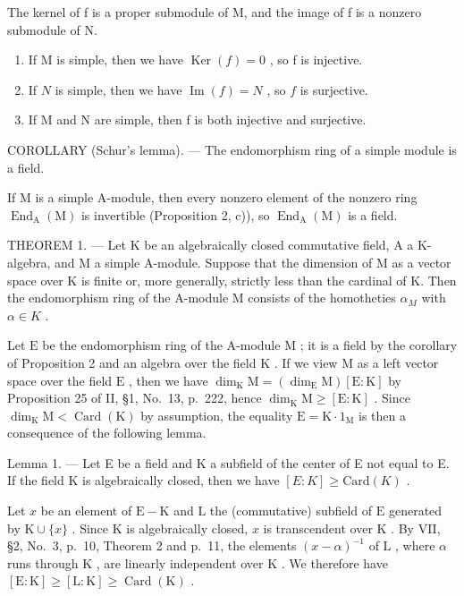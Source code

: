 The kernel of f is a proper submodule of M, and the image of f is a nonzero submodule of N.

\begin{enumerate}
\def\labelenumi{\alph{enumi})}
\item
  If M is simple, then we have \(\operatorname{Ker}(f)=0\) , so f is injective.
\item
  If \(N\) is simple, then we have \(\operatorname{Im}(f) = N\) , so \(f\) is surjective.
\item
  If M and N are simple, then f is both injective and surjective.
\end{enumerate}

COROLLARY (Schur's lemma). --- The endomorphism ring of a simple module is a field.

If M is a simple A-module, then every nonzero element of the nonzero ring \(\operatorname{End}_{\mathrm{A}}(\mathrm{M})\) is invertible (Proposition 2, c)), so \(\operatorname{End}_{\mathrm{A}}(\mathrm{M})\) is a field.

THEOREM 1. --- Let K be an algebraically closed commutative field, A a K-algebra, and M a simple A-module. Suppose that the dimension of M as a vector space over K is finite or, more generally, strictly less than the cardinal of K. Then the endomorphism ring of the A-module M consists of the homotheties \(\alpha_{M}\) with \(\alpha \in K\) .

Let \(\mathrm{E}\) be the endomorphism ring of the A-module \(\mathrm{M}\) ; it is a field by the corollary of Proposition 2 and an algebra over the field \(\mathrm{K}\) . If we view \(\mathrm{M}\) as a left vector space over the field \(\mathrm{E}\) , then we have \(\dim_{\mathrm{K}} \mathrm{M} = (\dim_{\mathrm{E}} \mathrm{M})[\mathrm{E} : \mathrm{K}]\) by Proposition 25 of II, §1, No.~13, p.~222, hence \(\dim_{\mathrm{K}} \mathrm{M} \geqslant [\mathrm{E} : \mathrm{K}]\) . Since \(\dim_{\mathrm{K}} \mathrm{M} < \operatorname{Card}(\mathrm{K})\) by assumption, the equality \(\mathrm{E} = \mathrm{K} \cdot 1_{\mathrm{M}}\) is then a consequence of the following lemma.

Lemma 1. --- Let E be a field and K a subfield of the center of E not equal to E. If the field K is algebraically closed, then we have \([E:K] \geqslant \text{Card}(K)\) .

Let \(x\) be an element of \(\mathrm{E} - \mathrm{K}\) and \(\mathrm{L}\) the (commutative) subfield of \(\mathrm{E}\) generated by \(\mathrm{K} \cup \{x\}\) . Since \(\mathrm{K}\) is algebraically closed, \(x\) is transcendent over \(\mathrm{K}\) . By VII, §2, No.~3, p.~10, Theorem 2 and p.~11, the elements \((x - \alpha)^{-1}\) of \(\mathrm{L}\) , where \(\alpha\) runs through \(\mathrm{K}\) , are linearly independent over \(\mathrm{K}\) . We therefore have \([\mathrm{E} : \mathrm{K}] \geqslant [\mathrm{L} : \mathrm{K}] \geqslant \operatorname{Card}(\mathrm{K})\) .

